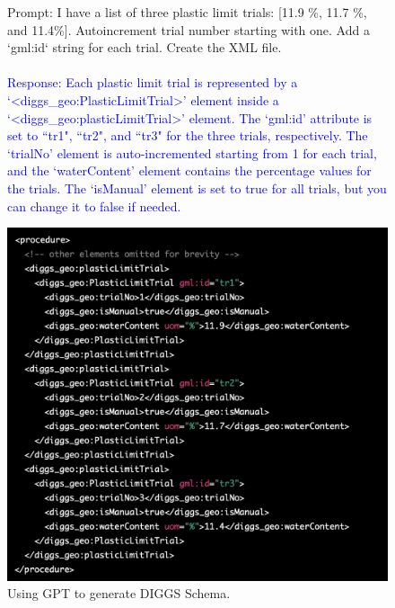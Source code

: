 \documentclass{article}
\begin{document}
\begin{figure}[ht]
    \begin{minipage}{0.48\textwidth}
    \textcolor{RedOrange}{Prompt: I have a list of three plastic limit trials: [11.9 \%, 11.7 \%, and 11.4\%]. Autoincrement trial number starting with one. Add a `gml:id` string for each trial. Create the XML file. }
    \\\\
    \textcolor{blue}{Response: Each plastic limit trial is represented by a `\textless diggs\_geo:PlasticLimitTrial\textgreater' element inside a `\textless diggs\_geo:plasticLimitTrial\textgreater' element. The `gml:id' attribute is set to ``tr1", ``tr2", and ``tr3" for the three trials, respectively. The `trialNo' element is auto-incremented starting from 1 for each trial, and the `waterContent' element contains the percentage values for the trials. The `isManual' element is set to true for all trials, but you can change it to false if needed.}
    \end{minipage}%
    \hspace{0.5cm}%
    \begin{minipage}[r]{0.45\textwidth}
    \includegraphics[width = \linewidth]{figs/diggs.png}
    \end{minipage}
    \caption{Using GPT to generate DIGGS Schema.}
    \label{fig:diggs}
\end{figure}
\end{document}
